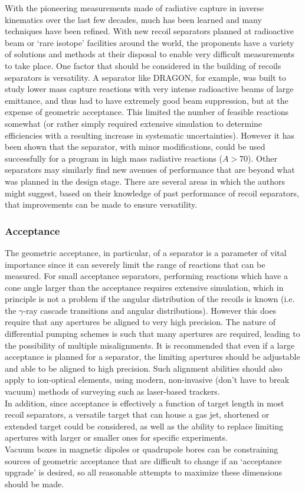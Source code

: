 With the pioneering measurements made of radiative capture in inverse kinematics over the last few decades, much has been learned and many techniques have been refined. With new recoil separators planned at radioactive beam or `rare isotope' facilities around the world, the proponents have a variety of solutions and methods at their disposal to enable very difficult measurements to take place. One factor that should be considered in the building of recoils separators is versatility. A separator like DRAGON, for example, was built to study lower mass capture reactions with very intense radioactive beams of large emittance, and thus had to have extremely good beam suppression, but at the expense of geometric acceptance. This limited the number of feasible reactions somewhat (or rather simply required extensive simulation to determine efficiencies with a resulting increase in systematic uncertainties). However it has been shown that the separator, with minor modifications, could be used successfully for a program in high mass radiative reactions ($A>70$). Other separators may similarly find new avenues of performance that are beyond what was planned in the design stage. There are several areas in which the authors might suggest, based on their knowledge of past performance of recoil separators, that improvements can be made to ensure versatility.

\subsubsection{Acceptance}

The geometric acceptance, in particular, of a separator is a parameter of vital importance since it can severely limit the range of reactions that can be measured. For small acceptance separators, performing reactions which have a cone angle larger than the acceptance requires extensive simulation, which in principle is not a problem if the angular distribution of the recoils is known (i.e. the $\gamma$-ray cascade transitions and angular distributions). However this does require that any apertures be aligned to very high precision. The nature of differential pumping schemes is such that many apertures are required, leading to the possibility of multiple misalignments. It is recommended that even if a large acceptance is planned for a separator, the limiting apertures should be adjustable and able to be aligned to high precision. Such alignment abilities should also apply to ion-optical elements, using modern, non-invasive (don't have to break vacuum) methods of surveying such as laser-based trackers.\\
In addition, since acceptance is effectively a function of target length in most recoil separators, a versatile target that can house a gas jet, shortened or extended target could be considered, as well as the ability to replace limiting apertures with larger or smaller ones for specific experiments. \\
Vacuum boxes in magnetic dipoles or quadrupole bores can be constraining sources of geometric acceptance that are difficult to change if an `acceptance upgrade' is desired, so all reasonable attempts to maximize these dimensions should be made.

